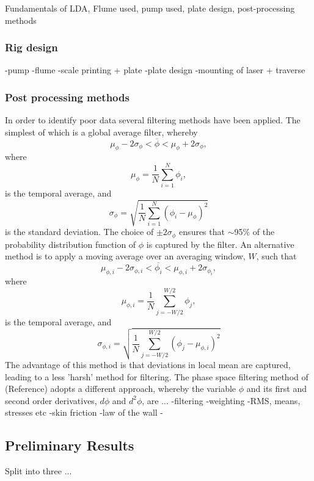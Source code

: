 \documentclass[12pt,oneside,a4paper]{article}
\begin{document}
Fundamentals of LDA, Flume used, pump used, plate design, post-processing methods 
\subsubsection{Rig design}
-pump
-flume
-scale printing + plate
-plate design
-mounting of laser + traverse
\subsubsection{Post processing methods}
In order to identify poor data several filtering methods have been applied. The simplest of which is a global average filter, whereby 
\begin{equation}
\mu_\phi - 2 \sigma_\phi < \overline{\phi} < \mu_\phi + 2 \sigma_\phi,
\end{equation}
where 
\begin{equation}
\mu_\phi = \frac{1}{N} \sum^N_{i=1} \phi_i,
\end{equation}
is the temporal average, and
\begin{equation}
\sigma_\phi = \sqrt{\frac{1}{N} \sum^N_{i=1} (\phi_i - \mu_\phi)^2	} 
\end{equation}
is the standard deviation. The choice of $\pm 2 \sigma_\phi$ ensures that $\sim$95$\%$ of the probability distribution function of $\phi$ is captured by the filter. An alternative method is to apply a moving average over an averaging window, $W$, such that
\begin{equation}
\mu_{\phi,i} - 2 \sigma_{\phi,i} < \overline{\phi_i} < \mu_{\phi,i} + 2 \sigma_{\phi_i},
\end{equation}
where 
\begin{equation}
\mu_{\phi,i} = \frac{1}{N} \sum^{W/2}_{j=-W/2} \phi_j,
\end{equation}
is the temporal average, and
\begin{equation}
\sigma_{\phi,i} = \sqrt{\frac{1}{N} \sum^{W/2}_{j=-W/2} (\phi_j - \mu_{\phi,i})^2	} 
\end{equation}
\vspace{2cm}
The advantage of this method is that deviations in local mean are captured, leading to a less 'harsh' method for filtering. The phase space filtering method of (Reference) adopts a different approach, whereby the variable $\phi$ and its first and second order derivatives, $d \phi$ and $d^2 \phi$, are ...
-filtering
-weighting
-RMS, means, stresses etc
-skin friction
-law of the wall 
-
\subsection{Preliminary Results}
Split into three ...
\end{document}
